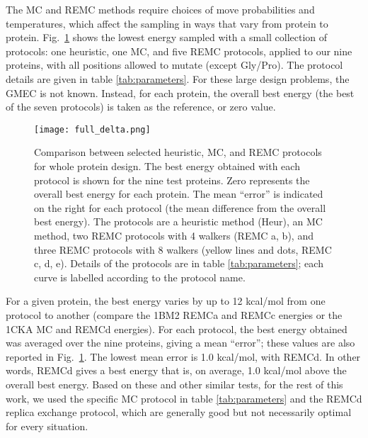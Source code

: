 The MC and REMC methods require choices of move probabilities and temperatures, which affect the sampling in ways that vary from protein to protein. Fig.\ \ref{fig:fulldelta} shows the lowest energy sampled with a small collection of protocols: one heuristic, one MC, and five REMC protocols, applied to our nine proteins, with all positions allowed to mutate (except Gly/Pro). The protocol details are given in table \ref{tab:parameters}. For these large design problems, the GMEC is not known. Instead, for each protein, the overall best energy (the best of the seven protocols) is taken as the reference, or zero value.


    \begin{figure}[!htbp]
      \centering
        \texttt{[image: full\_delta.png]} 
      \caption{
Comparison between selected heuristic, MC, and REMC protocols for whole protein design. The best energy obtained with each protocol is shown for the nine test proteins. Zero represents the overall best energy for each protein. The mean ``error'' is indicated on the right for each protocol (the mean difference from the overall best energy). The protocols are a heuristic method (Heur), an MC method, two REMC protocols with 4 walkers (REMC a, b), and three REMC protocols with 8 walkers (yellow lines and dots, REMC c, d, e). Details of the protocols are in table \ref{tab:parameters}; each curve is labelled according to the protocol name.
}
       \label{fig:fulldelta}
    \end{figure}

For a given protein, the best energy varies by up to 12 kcal/mol from one protocol to another (compare the 1BM2 REMCa and REMCc energies or the 1CKA MC and REMCd energies). For each protocol, the best energy obtained was averaged over the nine proteins, giving a mean ``error''; these values are also reported in Fig.\ \ref{fig:fulldelta}. The lowest mean error is 1.0 kcal/mol, with REMCd. In other words, REMCd gives a best energy that is, on average, 1.0 kcal/mol above the overall best energy. Based on these and other similar tests, for the rest of this work, we used the specific MC protocol in table \ref{tab:parameters} and the REMCd replica exchange protocol, which are generally good but not necessarily optimal for every situation. 

